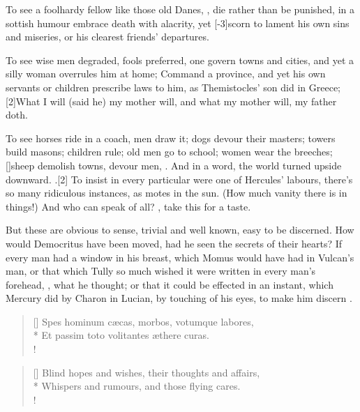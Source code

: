 {To see a foolhardy fellow like those old Danes, , die rather than be punished, in a sottish humour
embrace death with alacrity, yet [-3\baselineskip]scorn to lament his own sins and
miseries, or his clearest friends' departures.

To see wise men degraded, fools preferred, one govern towns and cities,
and yet a silly woman overrules him at home; Command a province,
and yet his own servants or children prescribe laws to him, as
Themistocles' son did in Greece; [2\baselineskip]What I will (said he) my mother
will, and what my mother will, my father doth.

To see horses ride in a coach, men draw it; dogs devour their masters; towers build masons;
children rule; old men go to school; women wear the breeches;
[\baselineskip]sheep demolish towns, devour men, \etc{}. And in a word, the world
turned upside downward. .[2\baselineskip] To insist in every particular were one of Hercules' labours,
there's so many ridiculous instances, as motes in the sun.  (How much vanity there is in things!) And who can speak
of all? , take this for a taste.

But these are obvious to sense, trivial and well known, easy to be
discerned. How would Democritus have been moved, had he seen the
secrets of their hearts? If every man had a window in his breast, which
Momus would have had in Vulcan's man, or that which Tully so much
wished it were written in every man's forehead, , what he thought; or that it could be effected in an
instant, which Mercury did by Charon in Lucian, by touching of his
eyes, to make him discern .
%
\begin{latin}
\begin{verse}[\versewidth]
Spes hominum c\ae{}cas, morbos, votumque labores,\\*
Et passim toto volitantes \ae{}there curas.\\!
\end{verse}
\end{latin}
\translationrule%
\settowidth{\versewidth}{Blind hopes and wishes, their thoughts and affairs,}
\begin{verse}[\versewidth]
Blind hopes and wishes, their thoughts and affairs,\\*
Whispers and rumours, and those flying cares.\\!
\end{verse}

}
